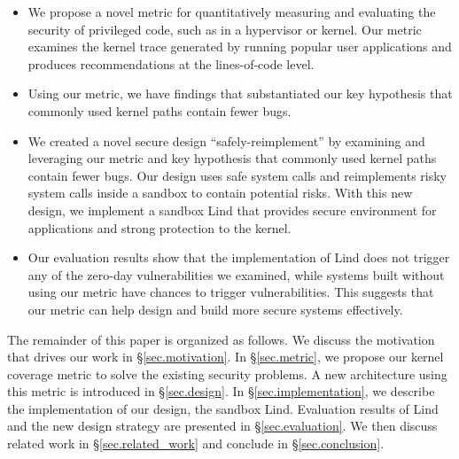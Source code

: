 \begin{itemize}
\item We propose a novel metric for quantitatively measuring and evaluating 
the security of privileged code, such as in a hypervisor or kernel. 
Our metric examines the kernel trace generated by running popular user 
applications and produces recommendations at the lines-of-code level.  

\item Using our metric, we have findings that substantiated our key hypothesis that commonly used kernel paths 
contain fewer bugs.  

\item We created a novel secure design ``safely-reimplement'' 
by examining and leveraging our metric and key hypothesis 
that commonly used kernel paths contain fewer bugs.  
Our design uses safe system calls and reimplements risky system 
calls inside a sandbox to contain potential risks. With this new design, 
we implement a sandbox Lind that provides secure environment
for applications and strong protection to the kernel. 

\item Our evaluation results show that the implementation of Lind does 
not trigger any of the zero-day vulnerabilities we examined, 
while systems built without using our metric have chances to trigger
vulnerabilities. This suggests 
that our metric can help design and build more secure systems effectively.
\end{itemize}

The remainder of this paper is organized as follows. 
We discuss the motivation that drives our work in \S{\ref{sec.motivation}}. 
In \S{\ref{sec.metric}}, we propose our kernel coverage metric to solve the existing 
security problems. %
A new architecture using this metric is introduced in \S{\ref{sec.design}}. 
In \S{\ref{sec.implementation}}, we describe the implementation of our design, 
the sandbox Lind. Evaluation results of Lind and the new design strategy 
are presented in \S{\ref{sec.evaluation}}. We then discuss related work in 
\S{\ref{sec.related_work}} and conclude in \S{\ref{sec.conclusion}}. 
